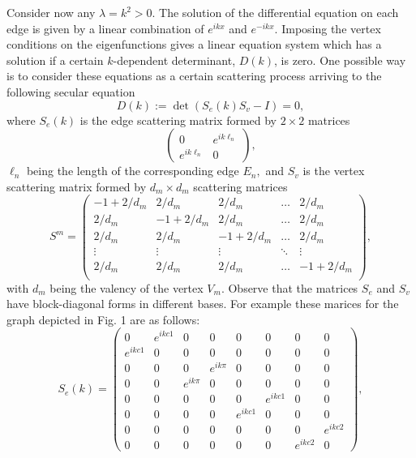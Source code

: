 \documentclass[a4paper]{article}
\begin{document}
Consider now any $ \lambda = k^2 > 0 .$
 The solution of the differential equation on each edge is given by a linear combination of $e^{i k x}$ and $e^{-i k x}$. Imposing the vertex conditions on the eigenfunctions gives a linear equation system which has a solution if a certain $k$-dependent determinant, $D(k)$, is zero. One possible way is to consider these equations as a certain scattering process arriving to the following secular equation
 \begin{equation}
 D(k) := \det \left( S_e (k) S_v - I \right) = 0,
 \end{equation}
 where $ S_e (k) $ is the edge scattering matrix formed by $ 2 \times 2 $ matrices $$ \left(
 \begin{array}{cc}
 0 & e^{ik \ell_n} \\
 e^{ik \ell_n}  & 0
 \end{array} \right) ,$$
 $ \ell_n $ being the length of the corresponding edge $ E_n,$
  and $ S_v $ is the vertex scattering matrix formed by $ d_m \times d_m $ scattering matrices 
 $$ S^m = \left(
 \begin{array}{ccccc}
 -1 + 2/d_m & 2/d_m & 2/d_m & \dots & 2/d_m \\
 2/d_m & -1 + 2/d_m & 2/d_m & \dots & 2/d_m \\
 2/d_m & 2/d_m & -1 + 2/d_m & \dots & 2/d_m \\
 \vdots & \vdots & \vdots & \ddots & \vdots \\
  2/d_m & 2/d_m & 2/d_m & \dots & -1 + 2/d_m \\
 \end{array} \right) ,$$
 with $ d_m $ being the valency of the vertex $ V_m. $
 Observe that the matrices $ S_e $ and $ S_v $ have block-diagonal forms in different bases. For example these marices for the graph depicted in Fig. 1 are as follows:
 $$ S_e (k) =
 \left(
 \begin{array}{cccccccc}
 0 & e^{ikc1} & 0 & 0 & 0 & 0 & 0 & 0 \\
 e^{ikc1} & 0 & 0 & 0 & 0 & 0 & 0 & 0 \\
      0 & 0 & 0 & e^{ik\pi} & 0 & 0 & 0 & 0 \\
  0 & 0 & e^{ik \pi} & 0 & 0 & 0 & 0 & 0 \\
   0 & 0 & 0 & 0 & 0 & e^{ikc1} & 0 & 0 \\
    0 & 0 & 0 & 0 & e^{ikc1} & 0 & 0 & 0 \\
     0 & 0 & 0 & 0 & 0 & 0 & 0 & e^{ikc2} \\
      0 & 0 & 0 & 0 & 0 & 0 & e^{ikc2} & 0 \end{array} \right) ,$$
\end{document}
